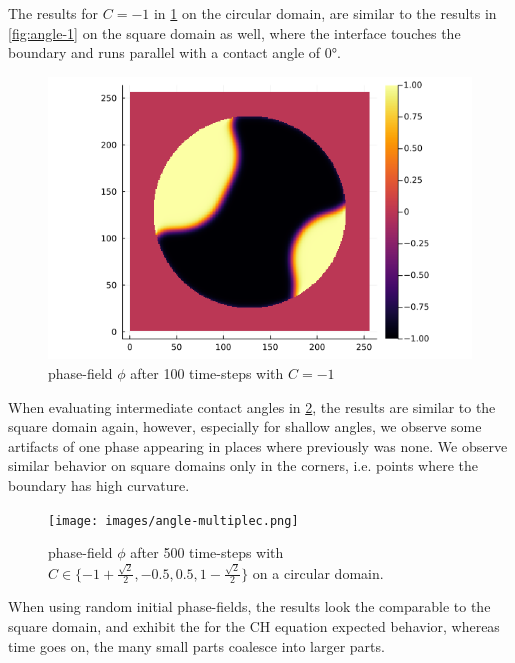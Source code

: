 \documentclass{mimosis}
\begin{document}
The results for \(C=-1\) in \ref{fig:angle-1c} on the circular domain, are similar to the results in \ref{fig:angle-1} on the square domain as well, where the interface touches the boundary and runs parallel with a contact angle of 0°.
\begin{figure}[htbp]
\centering
\includegraphics[width=.9\linewidth]{images/angle-1c.png}
\caption{\label{fig:angle-1c}phase-field \(\phi\) after 100 time-steps with \(C=-1\)}
\end{figure}

When evaluating intermediate contact angles in \ref{fig:angle-multiplec}, the results are similar to the square domain again, however, especially for shallow angles, we observe some artifacts of one phase appearing in places where previously was none. We observe similar behavior on square domains only in the corners, i.e. points where the boundary has high curvature.
\begin{figure}[htbp]
\centering
\texttt{[image: images/angle-multiplec.png]}
\caption{\label{fig:angle-multiplec}phase-field \(\phi\) after 500 time-steps with \(C \in \{-1 + \frac{\sqrt{2}}{2} , -0.5 , 0.5 , 1 - \frac{\sqrt{2}}{2} \}\) on a circular domain.}
\end{figure}



When using random initial phase-fields, the results look the comparable to the square domain, and exhibit the for the CH equation expected behavior, whereas time goes on, the many small parts coalesce into larger parts.
\end{document}

